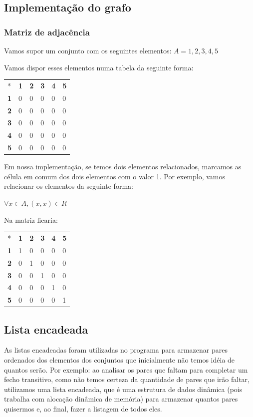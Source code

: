 \documentclass[12pt]{article}
\begin{document}
\subsection{Implementação do grafo}
\subsubsection{Matriz de adjacência}
Vamos supor um conjunto com os seguintes elementos: $A = {1,2,3,4,5}$

Vamos dispor esses elementos numa tabela da seguinte forma:

\begin{center}
\begin{tabular}{llllll}
* & \textbf{1} & \textbf{2} & \textbf{3} & \textbf{4} & \textbf{5}\\
\textbf{1} & 0 & 0 & 0 & 0 & 0\\
\textbf{2} & 0 & 0 & 0 & 0 & 0\\
\textbf{3} & 0 & 0 & 0 & 0 & 0\\
\textbf{4} & 0 & 0 & 0 & 0 & 0\\
\textbf{5} & 0 & 0 & 0 & 0 & 0
\end{tabular}
\end{center}

Em nossa implementação, se temos dois elementos relacionados, marcamos as célula em 
comum dos dois elementos com o valor 1. Por exemplo, vamos relacionar os elementos da 
seguinte forma:

$\forall x \in A, (x, x) \in R$

Na matriz ficaria:

\begin{center}
\begin{tabular}{llllll}
* & \textbf{1} & \textbf{2} & \textbf{3} & \textbf{4} & \textbf{5}\\
\textbf{1} & 1 & 0 & 0 & 0 & 0\\
\textbf{2} & 0 & 1 & 0 & 0 & 0\\
\textbf{3} & 0 & 0 & 1 & 0 & 0\\
\textbf{4} & 0 & 0 & 0 & 1 & 0\\
\textbf{5} & 0 & 0 & 0 & 0 & 1
\end{tabular}
\end{center}

\subsection{Lista encadeada}
As listas encadeadas foram utilizadas no programa para armazenar pares ordenados dos 
elementos dos conjuntos que inicialmente não temos idéia de quantos serão.
Por exemplo: ao analisar os pares que faltam para completar um fecho transitivo, 
como não temos certeza da quantidade de pares que irão faltar, utilizamos uma
lista encadeada, que é uma estrutura de dados dinâmica (pois trabalha com alocação 
dinâmica de memória) para armazenar quantos pares quisermos e, ao final, fazer
a listagem de todos eles.
\end{document}
